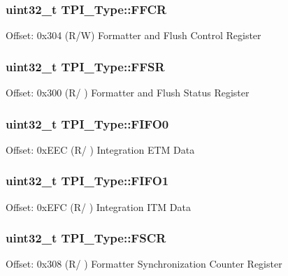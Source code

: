 \subsubsection[{\texorpdfstring{F\+F\+CR}{FFCR}}]{ uint32\+\_\+t T\+P\+I\+\_\+\+Type\+::\+F\+F\+CR}\hypertarget{structTPI__Type_a3eb42d69922e340037692424a69da880}{}\label{structTPI__Type_a3eb42d69922e340037692424a69da880}
Offset\+: 0x304 (R/W) Formatter and Flush Control Register 
\subsubsection[{\texorpdfstring{F\+F\+SR}{FFSR}}]{ uint32\+\_\+t T\+P\+I\+\_\+\+Type\+::\+F\+F\+SR}\hypertarget{structTPI__Type_ae67849b2c1016fe6ef9095827d16cddd}{}\label{structTPI__Type_ae67849b2c1016fe6ef9095827d16cddd}
Offset\+: 0x300 (R/ ) Formatter and Flush Status Register 
\subsubsection[{\texorpdfstring{F\+I\+F\+O0}{FIFO0}}]{ uint32\+\_\+t T\+P\+I\+\_\+\+Type\+::\+F\+I\+F\+O0}\hypertarget{structTPI__Type_ae91ff529e87d8e234343ed31bcdc4f10}{}\label{structTPI__Type_ae91ff529e87d8e234343ed31bcdc4f10}
Offset\+: 0x\+E\+EC (R/ ) Integration E\+TM Data 
\subsubsection[{\texorpdfstring{F\+I\+F\+O1}{FIFO1}}]{ uint32\+\_\+t T\+P\+I\+\_\+\+Type\+::\+F\+I\+F\+O1}\hypertarget{structTPI__Type_aebaa9b8dd27f8017dd4f92ecf32bac8e}{}\label{structTPI__Type_aebaa9b8dd27f8017dd4f92ecf32bac8e}
Offset\+: 0x\+E\+FC (R/ ) Integration I\+TM Data 
\subsubsection[{\texorpdfstring{F\+S\+CR}{FSCR}}]{ uint32\+\_\+t T\+P\+I\+\_\+\+Type\+::\+F\+S\+CR}\hypertarget{structTPI__Type_a377b78fe804f327e6f8b3d0f37e7bfef}{}\label{structTPI__Type_a377b78fe804f327e6f8b3d0f37e7bfef}
Offset\+: 0x308 (R/ ) Formatter Synchronization Counter Register 
